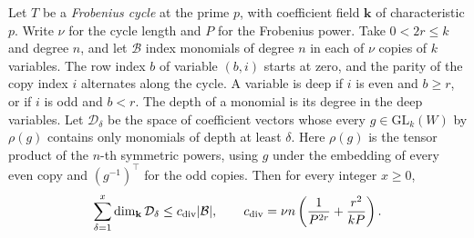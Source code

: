 \begin{lemma}
\label{lem:a-edge-deep-form-count}
\emitthmsource
Let $T$ be a \emph{Frobenius cycle} at the prime $p$, with coefficient field $\mathbf k$ of characteristic $p$. Write $\nu$ for the cycle length and $P$ for the Frobenius power. Take $0<2r\le k$ and degree $n$, and let $\mathcal B$ index monomials of degree $n$ in each of $\nu$ copies of $k$ variables. The row index $b$ of variable $(b,i)$ starts at zero, and the parity of the copy index $i$ alternates along the cycle. A variable is deep if $i$ is even and $b\ge r$, or if $i$ is odd and $b<r$. The depth of a monomial is its degree in the deep variables. Let $\mathcal D_\delta$ be the space of coefficient vectors whose every $g\in\mathrm{GL}_k(W)$ by $\rho(g)$ contains only monomials of depth at least $\delta$. Here $\rho(g)$ is the tensor product of the $n$-th symmetric powers, using $g$ under the embedding of every even copy and $(g^{-1})^\top$ for the odd copies. Then for every integer $x\ge0$,
\[
 \sum_{\delta=1}^x\dim_{\mathbf k}\mathcal D_\delta
 \le c_{\rm div}|\mathcal B|,
 \qquad
 c_{\rm div}=\nu n\left(\frac1{P^{2r}}+\frac{r^2}{kP}\right).
\]
\end{lemma}
